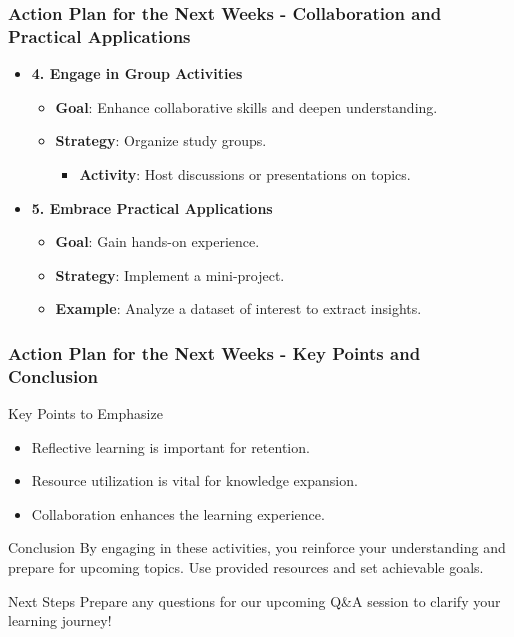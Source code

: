 \documentclass[aspectratio=169]{beamer}
\begin{document}
\begin{frame}[fragile]
    \frametitle{Action Plan for the Next Weeks - Collaboration and Practical Applications}
    \begin{itemize}
        \item \textbf{4. Engage in Group Activities}
        \begin{itemize}
            \item \textbf{Goal}: Enhance collaborative skills and deepen understanding.
            \item \textbf{Strategy}: Organize study groups.
            \begin{itemize}
                \item \textbf{Activity}: Host discussions or presentations on topics.
            \end{itemize}
        \end{itemize}

        \item \textbf{5. Embrace Practical Applications}
        \begin{itemize}
            \item \textbf{Goal}: Gain hands-on experience.
            \item \textbf{Strategy}: Implement a mini-project.
            \item \textbf{Example}: Analyze a dataset of interest to extract insights.
        \end{itemize}
    \end{itemize}
\end{frame}

\begin{frame}[fragile]
    \frametitle{Action Plan for the Next Weeks - Key Points and Conclusion}
    \begin{block}{Key Points to Emphasize}
        \begin{itemize}
            \item Reflective learning is important for retention.
            \item Resource utilization is vital for knowledge expansion.
            \item Collaboration enhances the learning experience.
        \end{itemize}
    \end{block}

    \begin{block}{Conclusion}
        By engaging in these activities, you reinforce your understanding and prepare for upcoming topics. Use provided resources and set achievable goals.
    \end{block}

    \begin{block}{Next Steps}
        Prepare any questions for our upcoming Q\&A session to clarify your learning journey!
    \end{block}
\end{frame}
\end{document}
